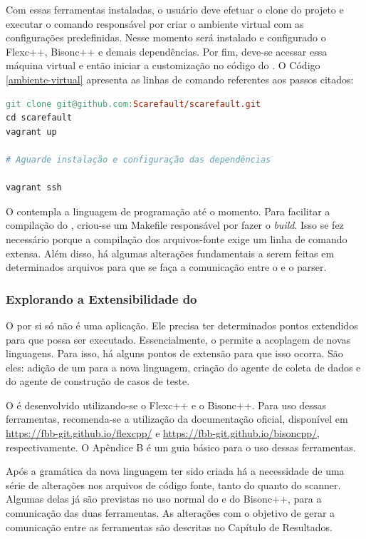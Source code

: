 Com essas ferramentas instaladas, o usuário deve efetuar o clone do projeto
e executar o comando responsável por criar o ambiente virtual com as configurações
predefinidas. Nesse momento será instalado e configurado o \textsf{Flexc++},
\textsf{Bisonc++} e demais dependências. Por fim, deve-se acessar essa máquina
virtual e então iniciar a customização no código do \Scarefault. O Código
\ref{ambiente-virtual} apresenta as linhas de comando referentes aos passos citados:

\begin{lstlisting}[language=make, label=ambiente-virtual, caption=Levantamento do Ambiente de Desenvolvimento]
git clone git@github.com:Scarefault/scarefault.git
cd scarefault
vagrant up

# Aguarde instalação e configuração das dependências

vagrant ssh
\end{lstlisting}

O \scarefault contempla a linguagem de programação \grails até o momento.
Para facilitar a compilação do \Scarefault, criou-se um \textsf{Makefile}
responsável por fazer o \textit{build}. Isso se fez necessário porque a
compilação dos arquivos-fonte exige um linha de comando extensa. Além disso,
há algumas alterações fundamentais a serem feitas em determinados arquivos
para que se faça a comunicação entre o \scanner e o \textsf{parser}.

\subsubsection{Explorando a Extensibilidade do \Scarefault}
O \scarefault por si só não é uma aplicação. Ele precisa ter determinados pontos
extendidos para que possa ser executado. Essencialmente, o \scarefault permite a
acoplagem de novas linguagens. Para isso, há alguns pontos de extensão para que
isso ocorra. São eles: adição de um \parser para a nova linguagem, criação do
agente de coleta de dados e do agente de construção de casos de teste.

O \parser é desenvolvido utilizando-se o \textsf{Flexc++} e o \textsf{Bisonc++}. Para
uso dessas ferramentas, recomenda-se a utilização da documentação oficial, disponível
em \url{https://fbb-git.github.io/flexcpp/} e \url{https://fbb-git.github.io/bisoncpp/},
respectivamente. O Apêndice B é um guia básico para o uso dessas ferramentas.

Após a gramática da nova linguagem ter sido criada há a necessidade de
uma série de alterações nos arquivos de código fonte, tanto do \parser quanto do
\textsf{scanner}. Algumas delas já são previstas no uso normal do \flexcpp e do
\textsf{Bisonc++}, para a comunicação das duas ferramentas. As alterações com o
objetivo de gerar a comunicação entre as ferramentas são descritas no Capítulo de
Resultados.

